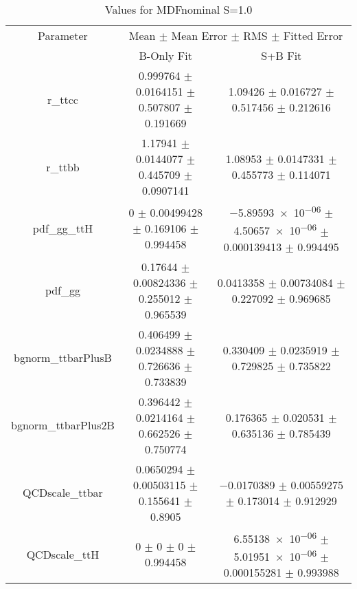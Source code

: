 \begin{table}
\centering
\caption{Values for MDFnominal S=1.0}
\begin{tabular}{ccc}
\toprule
Parameter & \multicolumn{2}{c}{Mean $\pm$ Mean Error $\pm$ RMS $\pm$ Fitted Error}\\
 & B-Only Fit & S+B Fit\\
\midrule
r\_ttcc & \num{0.999764} $\pm$ \num{0.0164151} $\pm$ \num{0.507807} $\pm$ \num{0.191669} & \num{1.09426} $\pm$ \num{0.016727} $\pm$ \num{0.517456} $\pm$ \num{0.212616}\\
r\_ttbb & \num{1.17941} $\pm$ \num{0.0144077} $\pm$ \num{0.445709} $\pm$ \num{0.0907141} & \num{1.08953} $\pm$ \num{0.0147331} $\pm$ \num{0.455773} $\pm$ \num{0.114071}\\
pdf\_gg\_ttH & \num{0} $\pm$ \num{0.00499428} $\pm$ \num{0.169106} $\pm$ \num{0.994458} & \num{-5.89593e-06} $\pm$ \num{4.50657e-06} $\pm$ \num{0.000139413} $\pm$ \num{0.994495}\\
pdf\_gg & \num{0.17644} $\pm$ \num{0.00824336} $\pm$ \num{0.255012} $\pm$ \num{0.965539} & \num{0.0413358} $\pm$ \num{0.00734084} $\pm$ \num{0.227092} $\pm$ \num{0.969685}\\
bgnorm\_ttbarPlusB & \num{0.406499} $\pm$ \num{0.0234888} $\pm$ \num{0.726636} $\pm$ \num{0.733839} & \num{0.330409} $\pm$ \num{0.0235919} $\pm$ \num{0.729825} $\pm$ \num{0.735822}\\
bgnorm\_ttbarPlus2B & \num{0.396442} $\pm$ \num{0.0214164} $\pm$ \num{0.662526} $\pm$ \num{0.750774} & \num{0.176365} $\pm$ \num{0.020531} $\pm$ \num{0.635136} $\pm$ \num{0.785439}\\
QCDscale\_ttbar & \num{0.0650294} $\pm$ \num{0.00503115} $\pm$ \num{0.155641} $\pm$ \num{0.8905} & \num{-0.0170389} $\pm$ \num{0.00559275} $\pm$ \num{0.173014} $\pm$ \num{0.912929}\\
QCDscale\_ttH & \num{0} $\pm$ \num{0} $\pm$ \num{0} $\pm$ \num{0.994458} & \num{6.55138e-06} $\pm$ \num{5.01951e-06} $\pm$ \num{0.000155281} $\pm$ \num{0.993988}\\
\bottomrule
\end{tabular}
\end{table}